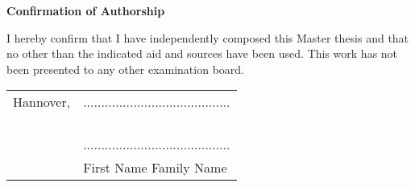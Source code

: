 \pagebreak
\begin{titlepage}

\begin{center}
\textbf{\huge{Confirmation of Authorship}}
\end{center}

\vspace{3cm}

\noindent I hereby confirm that I have independently composed this Master thesis and that no other than the indicated aid and sources have been used. This work has not been presented to any other examination board.

\vspace{5cm}

\hfill
\begin{tabular}{ll}
Hannover, &.........................................\\
\\
\\
\\
\\
  &......................................... \\
  &First Name Family Name \\					%
\end{tabular}




\end{titlepage}
